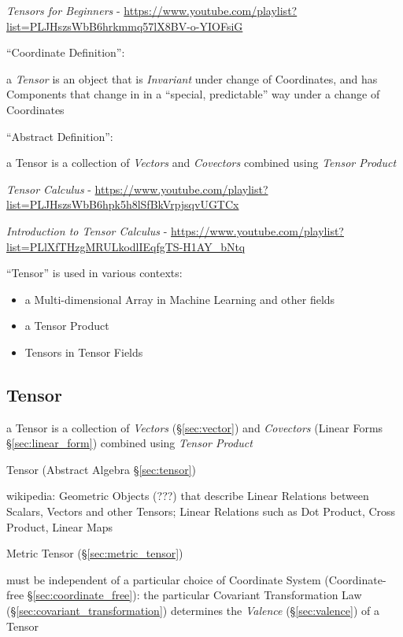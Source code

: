{\emph{Tensors for Beginners} -
\url{https://www.youtube.com/playlist?list=PLJHszsWbB6hrkmmq57lX8BV-o-YIOFsiG}

``Coordinate Definition'':

a \emph{Tensor} is an object that is \emph{Invariant} under change of
Coordinates, and has Components that change in in a ``special, predictable'' way
under a change of Coordinates

``Abstract Definition'':

a Tensor is a collection of \emph{Vectors} and \emph{Covectors} combined using
\emph{Tensor Product}

\emph{Tensor Calculus} -
\url{https://www.youtube.com/playlist?list=PLJHszsWbB6hpk5h8lSfBkVrpjsqvUGTCx}

\emph{Introduction to Tensor Calculus} -
\url{https://www.youtube.com/playlist?list=PLlXfTHzgMRULkodlIEqfgTS-H1AY_bNtq}

\fist ``Tensor'' is used in various contexts:
\begin{itemize}
  \item a Multi-dimensional Array in Machine Learning and other fields
  \item a Tensor Product
  \item Tensors in Tensor Fields
\end{itemize}



\subsection{Tensor}\label{sec:linear_tensor}

a Tensor is a collection of \emph{Vectors} (\S\ref{sec:vector}) and
\emph{Covectors} (Linear Forms \S\ref{sec:linear_form}) combined using
\emph{Tensor Product}

\fist Tensor (Abstract Algebra \S\ref{sec:tensor})

wikipedia: Geometric Objects (???) that describe Linear Relations
between Scalars, Vectors and other Tensors; Linear Relations such as
Dot Product, Cross Product, Linear Maps


\fist Metric Tensor (\S\ref{sec:metric_tensor})

must be independent of a particular choice of Coordinate System
(Coordinate-free \S\ref{sec:coordinate_free}): the particular Covariant
Transformation Law (\S\ref{sec:covariant_transformation}) determines
the \emph{Valence} (\S\ref{sec:valence}) of a Tensor

}
